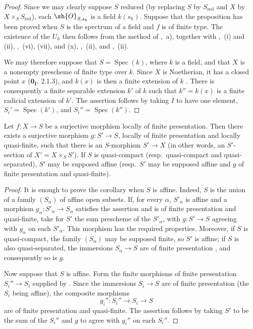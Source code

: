 \begin{proof}
Since we may clearly suppose $S$ reduced (by replacing $S$ by $S_{\mathrm{red}}$ and $X$ by $X\times_SS_{\mathrm{red}}$), each $\sh{O}_{S,s_h}$ is a field $k(s_h)$.  Suppose that the proposition has been proved when $S$ is the spectrum of a field and $f$ is of finite type.  The existence of the $U_h$ then follows from the method of ,~a), together with ,~(i) and (ii), ,~(vi), (vii), and (x), ,~(ii), and ,~(ii).

We may therefore suppose that $S=\operatorname{Spec}(k)$, where $k$ is a field, and that $X$ is a nonempty prescheme of finite type over $k$.  Since $X$ is Noetherian, it has a closed point $x$ ($\mathbf{0}_{\mathbf I}$, 2.1.3), and $k(x)$ is then a finite extension of $k$ .  There is consequently a finite separable extension $k'$ of $k$ such that $k''=k(x)$ is a finite radicial extension of $k'$.  The assertion follows by taking $I$ to have one element, $S_i'=\operatorname{Spec}(k')$, and $S_i''=\operatorname{Spec}(k'')$.
\end{proof}


\begin{corollary}[17.16.5]
\label{IV.17.16.5}
Let $f:X\to S$ be a surjective morphism locally of finite presentation.
Then there exists a surjective morphism $g:S'\to S$, locally of finite presentation and locally quasi-finite, such that there is an $S$-morphism $S'\to X$ (in other words, an $S'$-section of $X'=X\times_S S'$).
If $S$ is quasi-compact (resp.\ quasi-compact and quasi-separated), $S'$ may be supposed affine (resp.\ $S'$ may be supposed affine and $g$ of finite presentation and quasi-finite).
\end{corollary}

\begin{proof}
It is enough to prove the corollary when $S$ is affine.  Indeed, $S$ is the union of a family $(S_\alpha)$ of affine open subsets.  If, for every $\alpha$, $S'_\alpha$ is affine and a morphism $g_\alpha:S'_\alpha\to S_\alpha$ satisfies the assertion and is of finite presentation and quasi-finite, take for $S'$ the sum prescheme of the $S'_\alpha$, with $g:S'\to S$ agreeing with $g_\alpha$ on each $S'_\alpha$.  This morphism has the required properties.  Moreover, if $S$ is quasi-compact, the family $(S_\alpha)$ may be supposed finite, so $S'$ is affine; if $S$ is also quasi-separated, the immersions $S_\alpha\to S$ are of finite presentation , and consequently so is $g$.

Now suppose that $S$ is affine.  Form the finite morphisms of finite presentation $S_i''\to S_i$ supplied by .  Since the immersions $S_i\to S$ are of finite presentation (the $S_i$ being affine), the composite morphisms
\[
 g_i'':S_i''\longrightarrow S_i\longrightarrow S
\]
are of finite presentation and quasi-finite.  The assertion follows by taking $S'$ to be the sum of the $S_i''$ and $g$ to agree with $g_i''$ on each $S_i''$.
\end{proof}

